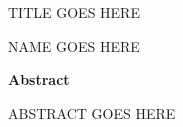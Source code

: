 \thispagestyle{plain}
\begin{center}
\textsc{\Large TITLE GOES HERE}

    \vspace{0.2cm}
    \normalsize{{\textsc{NAME GOES HERE}}}
    
\vspace{0.2cm}
    \normalsize{\textbf{Abstract}}
\end{center}
ABSTRACT GOES HERE
